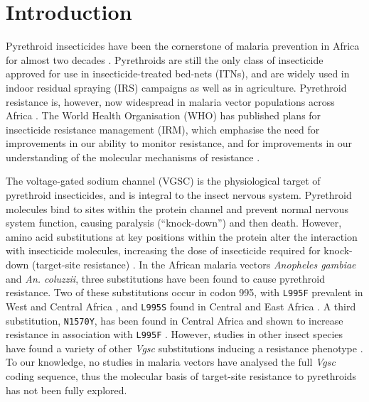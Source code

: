 \documentclass[a4paper,11pt,abstracton,hidelinks]{scrartcl}
\begin{document}
\section*{Introduction}


Pyrethroid insecticides have been the cornerstone of malaria prevention in Africa for almost two decades \cite{Bhatt2015}.
%
Pyrethroids are still the only class of insecticide approved for use in insecticide-treated bed-nets (ITNs), and are widely used in indoor residual spraying (IRS) campaigns as well as in agriculture.
%
Pyrethroid resistance is, however, now widespread in malaria vector populations across Africa \cite{Hemingway2016}.
%
The World Health Organisation (WHO) has published plans for insecticide resistance management (IRM), which emphasise the need for improvements in our ability to monitor resistance, and for improvements in our understanding of the molecular mechanisms of resistance \cite{WorldHealthOrganization2012}.


The voltage-gated sodium channel (VGSC) is the physiological target of pyrethroid insecticides, and is integral to the insect nervous system. 
%
Pyrethroid molecules bind to sites within the protein channel and prevent normal nervous system function, causing paralysis (``knock-down'') and then death. 
%
However, amino acid substitutions at key positions within the protein alter the interaction with insecticide molecules, increasing the dose of insecticide required for knock-down (target-site resistance) \cite{Davies2007a}. 
%
In the African malaria vectors \textit{Anopheles gambiae} and \textit{An. coluzzii}, three substitutions have been found to cause pyrethroid resistance. 
%
Two of these substitutions occur in codon 995\footnotemark, with \texttt{L995F} prevalent in West and Central Africa \cite{Martinez-Torres1998,Silva2014}, and \texttt{L995S} found in Central and East Africa \cite{Ranson2000,Silva2014}. 
%
%
A third substitution, \texttt{N1570Y}, has been found in Central Africa and shown to increase resistance in association with \texttt{L995F} \cite{Jones2012}.
%
However, studies in other insect species have found a variety of other \emph{Vgsc} substitutions inducing a resistance phenotype \cite{Davies2007b,Rinkevich2013,Dong2014}. 
%
To our knowledge, no studies in malaria vectors have analysed the full \emph{Vgsc} coding sequence, thus the molecular basis of target-site resistance to pyrethroids has not been fully explored.
\end{document}
